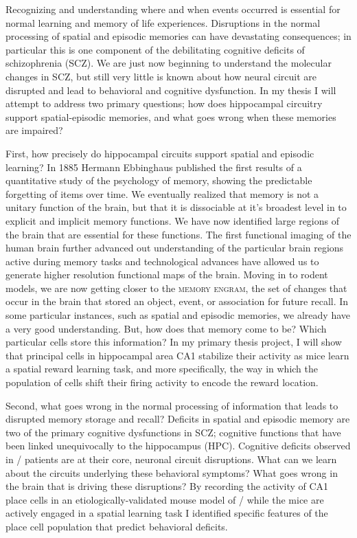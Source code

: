 \acresetall
Recognizing and understanding where and when events occurred is essential for normal learning and memory of life experiences.
Disruptions in the normal processing of spatial and episodic memories can have devastating consequences; in particular this is one component of the debilitating cognitive deficits of schizophrenia (SCZ).
We are just now beginning to understand the molecular changes in SCZ, but still very little is known about how neural circuit are disrupted and lead to behavioral and cognitive dysfunction.
In my thesis I will attempt to address two primary questions; how does hippocampal circuitry support spatial-episodic memories, and what goes wrong when these memories are impaired?

First, how precisely do hippocampal circuits support spatial and episodic learning?
In 1885 Hermann Ebbinghaus published the first results of a quantitative study of the psychology of memory, showing the predictable forgetting of items over time. We eventually realized that memory is not a unitary function of the brain, but that it is dissociable at it's broadest level in to explicit and implicit memory functions.
We have now identified large regions of the brain that are essential for these functions.
The first functional imaging of the human brain further advanced out understanding of the particular brain regions active during memory tasks and technological advances have allowed us to generate higher resolution functional maps of the brain. Moving in to rodent models, we are now getting closer to the \textsc{memory engram}, the set of changes that occur in the brain that stored an object, event, or association for future recall. In some particular instances, such as spatial and episodic memories, we already have a very good understanding. But, how does that memory come to be? Which particular cells store this information? In my primary thesis project, I will show that principal cells in hippocampal area CA1 stabilize their activity as mice learn a spatial reward learning task, and more specifically, the way in which the population of cells shift their firing activity to encode the reward location.

Second, what goes wrong in the normal processing of information that leads to disrupted memory storage and recall?
Deficits in spatial and episodic memory are two of the primary cognitive dysfunctions in SCZ; cognitive functions that have been linked unequivocally to the hippocampus (HPC).
Cognitive deficits observed in \scz/ patients are at their core, neuronal circuit disruptions.
What can we learn about the circuits underlying these behavioral symptoms?
What goes wrong in the brain that is driving these disruptions?
By recording the activity of CA1 place cells in an etiologically-validated mouse model of \scz/ while the mice are actively engaged in a spatial learning task I identified specific features of the place cell population that predict behavioral deficits.

